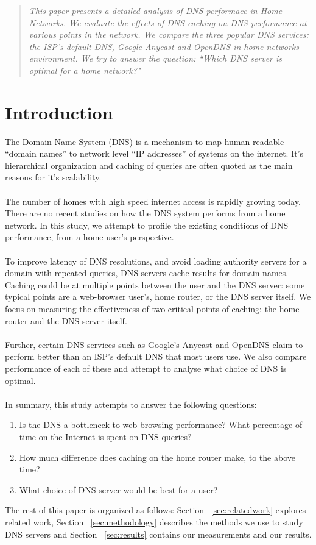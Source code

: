\documentclass[twocolumn]{article}
\author{\bf Nick Feamster, Abhinav Narain}
\date{\today}
\begin{document}
\normalsize
{}
\begin{abstract}
\textit{This paper presents a detailed analysis of DNS performace in Home Networks. We evaluate the effects of DNS caching on DNS performance at various points in the network. We compare the three popular DNS services: the ISP's default DNS, Google Anycast and OpenDNS in \textit{home networks} environment. We try to answer the question: ``Which DNS server is optimal for a home network?"}
\end{abstract}
\section{Introduction}
The Domain Name System (DNS) is a mechanism to map human readable “domain names” to network level “IP addresses” of systems on the internet. It’s hierarchical organization and caching of queries are often quoted as the main reasons for it’s scalability.
\\
\\
The number of homes with high speed internet access is rapidly growing today. There are no recent studies on how the DNS system performs from a home network. In this study, we attempt to profile the existing conditions of DNS performance, from a home user’s perspective.
\\
\\
To improve latency of DNS resolutions, and avoid loading authority servers for a domain with repeated queries, DNS servers cache results for domain names. Caching could be at multiple points between the user and the DNS server: some typical points are a web-browser user’s, home router, or the DNS server itself. We focus on measuring the effectiveness of two critical points of caching: the home router and the DNS server itself.
\\
\\
Further, certain DNS services such as Google’s Anycast and OpenDNS claim to perform better than an ISP’s default DNS that most users use. We also compare performance of each of these and attempt to analyse what choice of DNS is optimal.
\\
\\
In summary, this study attempts to answer the following questions:
\begin{enumerate}
\item Is the DNS a bottleneck to web-browsing performance? What percentage of time on the Internet is spent on DNS queries?
\item How much difference does caching on the home router make, to the above time?
\item What choice of DNS server would be best for a user?
\end{enumerate}
The rest of this paper is organized as follows: Section ~\ref{sec:relatedwork} explores related work, Section ~\ref{sec:methodology} describes the methods we use to study DNS servers and Section ~\ref{sec:results} contains our measurements and our results.
\end{document}
